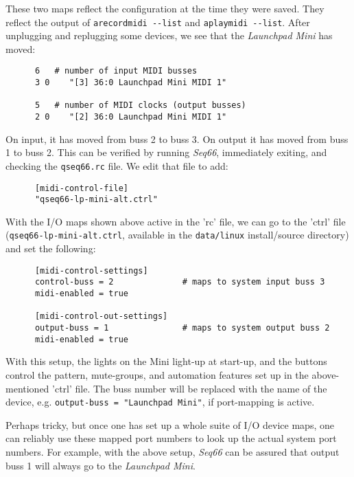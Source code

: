    These two maps reflect the configuration at the time they were saved.
   They reflect the output of \texttt{arecordmidi -{}-list} and
   \texttt{aplaymidi -{}-list}.
   After unplugging and replugging some devices, we see that the
   \textsl{Launchpad Mini} has moved:

   \begin{verbatim}
      6   # number of input MIDI busses
      3 0    "[3] 36:0 Launchpad Mini MIDI 1"

      5   # number of MIDI clocks (output busses)
      2 0    "[2] 36:0 Launchpad Mini MIDI 1"
   \end{verbatim}

   On input, it has moved from buss 2 to buss 3.
   On output it has moved from buss 1 to buss 2.
   This can be verified by running \textsl{Seq66}, immediately exiting,
   and checking the \texttt{qseq66.rc} file.
   We edit that file to add:

   \begin{verbatim}
      [midi-control-file]
      "qseq66-lp-mini-alt.ctrl"
   \end{verbatim}

   With the I/O maps shown above active in the 'rc' file,
   we can go to the 'ctrl' file (\texttt{qseq66-lp-mini-alt.ctrl}, available in
   the \texttt{data/linux} install/source directory)
   and set the following:

   \begin{verbatim}
      [midi-control-settings]
      control-buss = 2              # maps to system input buss 3
      midi-enabled = true

      [midi-control-out-settings]
      output-buss = 1               # maps to system output buss 2
      midi-enabled = true
   \end{verbatim}

   With this setup, the lights on the Mini light-up at start-up, and the
   buttons control the pattern, mute-groups, and automation features set up in
   the above-mentioned 'ctrl' file.
   The buss number will be replaced with the name of the
   device, e.g. \texttt{output-buss = "Launchpad Mini"}, if port-mapping
   is active.

   Perhaps tricky, but once one has set up a whole suite of I/O device maps,
   one can reliably use these mapped port numbers to look up the actual
   system port numbers.  For example, with the above setup, \textsl{Seq66} can
   be assured that output buss 1 will always go to the
   \textsl{Launchpad Mini}.

